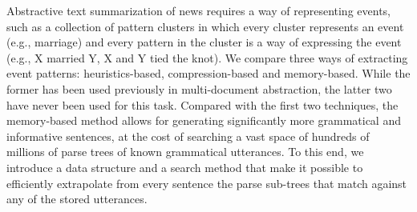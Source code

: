 Abstractive text summarization of news requires a way of representing events, such as a collection of pattern clusters in which every cluster represents an event (e.g., marriage) and every pattern in the cluster is a way of expressing the event (e.g., X married Y, X and Y tied the knot). We compare three ways of extracting event patterns: heuristics-based, compression-based and memory-based. While the former has been used previously in multi-document abstraction, the latter two have never been used for this task. Compared with the first two techniques, the memory-based method allows for generating significantly more grammatical and informative sentences, at the cost of searching a vast space of hundreds of millions of parse trees of known grammatical utterances. To this end, we introduce a data structure and a search method that make it possible to efficiently extrapolate from every sentence the parse sub-trees that match against any of the stored utterances.

